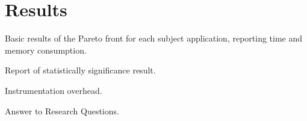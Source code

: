 
\section{Results}
Basic results of the Pareto front for each subject application, reporting time and memory consumption.

Report of statistically significance result.

Instrumentation overhead.

Answer to Research Questions.
